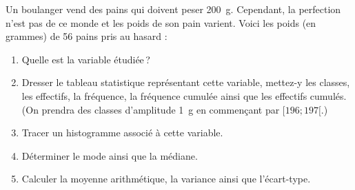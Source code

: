       \begin{exo}
            \label{exo:stat5}
            Un boulanger vend des pains qui doivent peser 200~g.
            Cependant, la perfection n'est pas de ce monde et les poids de son pain varient.
            Voici les poids (en grammes) de 56 pains pris au hasard :
            \begin{center}
            \end{center}
            \begin{enumerate}
	                  \item Quelle est la variable \'etudi\'ee\,?
                  \item Dresser le tableau statistique repr\'esentant cette variable,
                        mettez-y les classes, les effectifs, la fr\'equence, la fr\'equence cumul\'ee ainsi que les effectifs cumul\'es.
                        (On prendra des classes d'amplitude 1~g en commen\c{c}ant par $[196 ; 197[$.)
                  \item Tracer un histogramme associ\'e \`a cette variable.
                  \item D\'eterminer le mode ainsi que la m\'ediane.
                  \item Calculer la moyenne arithm\'etique, la variance ainsi que l'\'ecart-type.
            \end{enumerate}
      \end{exo}
